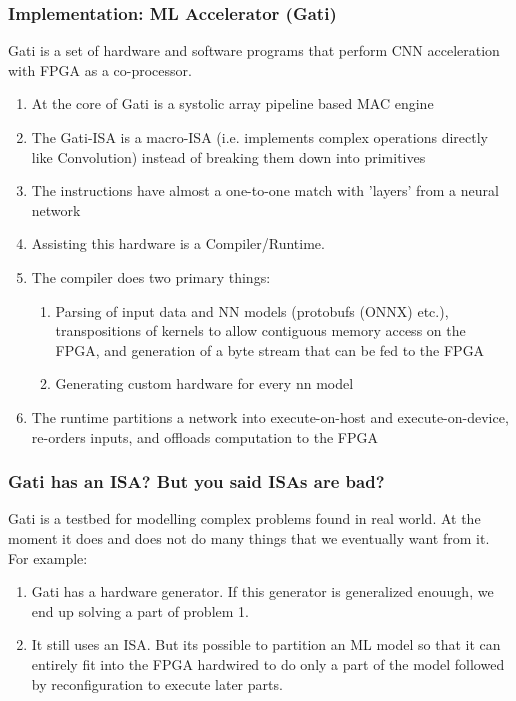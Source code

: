 \documentclass{beamer}
\begin{document}
\begin{frame}[fragile]
  \frametitle{Implementation: ML Accelerator (Gati)}
  Gati is a set of hardware and software programs that perform CNN
  acceleration with FPGA as a co-processor.
  \begin{enumerate}
    \item At the core of Gati is a systolic array pipeline based MAC engine
    \item The Gati-ISA is a macro-ISA (i.e. implements complex operations directly
      like Convolution) instead of breaking them down into primitives
    \item The instructions have almost a one-to-one match with 'layers'
      from a neural network
    \item Assisting this hardware is a Compiler/Runtime.
    \item The compiler does two primary things:
      \begin{enumerate}
        \item Parsing of input data and NN models (protobufs (ONNX) etc.),
          transpositions of kernels to allow contiguous memory access on the 
          FPGA, and generation
          of a byte stream that can be fed to the FPGA
        \item Generating custom hardware for every nn model
      \end{enumerate}
    \item The runtime partitions a network into execute-on-host and
      execute-on-device, re-orders inputs, and offloads computation
      to the FPGA
  \end{enumerate}
\end{frame}

\begin{frame}[fragile]
  \frametitle{Gati has an ISA? But you said ISAs are bad?}
  Gati is a testbed for modelling complex problems found in real world.
  At the moment it does and does not do many things that we eventually want
  from it.
  For example:
  \begin{enumerate}
    \item Gati has a hardware generator. If this generator is generalized
      enouugh, we end up solving a part of problem 1.
    \item It still uses an ISA. But its possible to partition an ML
      model so that it can entirely fit into 
      the FPGA hardwired to do only a part of the model followed by
      reconfiguration to execute later parts.
  \end{enumerate}
\end{frame}
\end{document}
